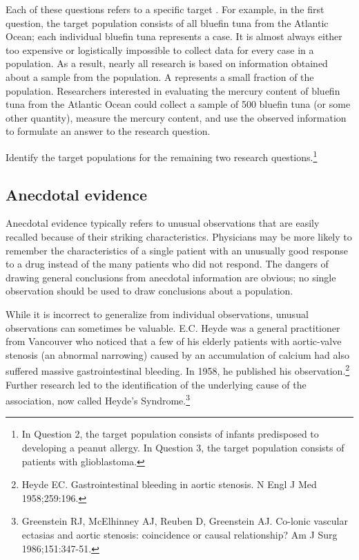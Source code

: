 Each of these questions refers to a specific target . For example, in the first question, the target population consists of all bluefin tuna from the Atlantic Ocean; each individual bluefin tuna represents a case. It is almost always either too expensive or logistically impossible to collect data for every case in a population. As a result, nearly all research is based on information obtained about a sample from the population. A  represents a small fraction of the population. Researchers interested in evaluating the mercury content of bluefin tuna from the Atlantic Ocean could collect a sample of 500 bluefin tuna (or some other quantity), measure the mercury content, and use the observed information to formulate an answer to the research question. 

\begin{exercise}
Identify the target populations for the remaining two research questions.\footnote{In Question 2, the target population consists of infants predisposed to developing a peanut allergy. In Question 3, the target population consists of patients with glioblastoma.}	
\end{exercise}

\subsection{Anecdotal evidence}
\label{anecdotalEvidence}

Anecdotal evidence typically refers to unusual observations that are easily recalled because of their striking characteristics. Physicians may be more likely to remember the characteristics of a single patient with an unusually good response to a drug instead of the many patients who did not respond.  The dangers of drawing general conclusions from anecdotal information are obvious; no single observation should be used to draw conclusions about a population.

While it is incorrect to generalize from individual observations, unusual observations can sometimes be valuable.  E.C. Heyde was a general practitioner from Vancouver who noticed that a few of his elderly patients with aortic-valve stenosis (an abnormal narrowing) caused by an accumulation of calcium had also suffered massive gastrointestinal bleeding. In 1958, he published his observation.\footnote{Heyde EC. Gastrointestinal bleeding in aortic stenosis. N Engl J Med 1958;259:196.} Further research led to the identification of the underlying cause of the association, now called Heyde's Syndrome.\footnote{Greenstein RJ, McElhinney AJ, Reuben D, Greenstein AJ. Co-lonic vascular ectasias and aortic stenosis: coincidence or causal relationship? Am J Surg 1986;151:347-51.}

